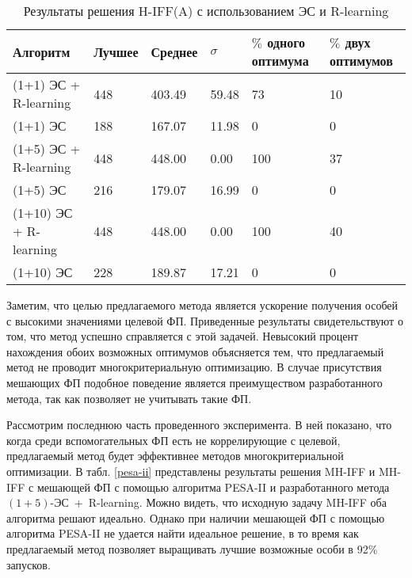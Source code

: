 \begin{table}[ht]
\begin{center}
\caption{Результаты решения H-IFF(A) с использованием ЭС и R-learning} \label{es-r}
\begin{tabular}{|l|l|l|l|l|l|}
\hline
Алгоритм & Лучшее & Среднее & $\sigma$ & $\%$ одного оптимума & $\%$ двух оптимумов\\
\hline
\rowcolor{light-gray}
(1+1) ЭС + R-learning & 448 & 403.49 & 59.48  & 73 & 10\\
(1+1) ЭС & 188 & 167.07 & 11.98 & 0 & 0\\ \hline
\rowcolor{light-gray}
(1+5) ЭС + R-learning & 448 & 448.00 & 0.00 & 100 & 37\\
(1+5) ЭС & 216 & 179.07 & 16.99 & 0 & 0 \\ \hline
\rowcolor{light-gray}
(1+10) ЭС + R-learning & 448 & 448.00 & 0.00 & 100 & 40\\
(1+10) ЭС & 228 & 189.87 & 17.21 & 0 & 0\\ \hline
\end{tabular}
\end{center}
\end{table}

Заметим, что целью предлагаемого метода является ускорение получения особей с высокими значениями целевой ФП. Приведенные результаты свидетельствуют о том, что метод успешно справляется с этой задачей. Невысокий процент нахождения обоих возможных оптимумов объясняется тем, что предлагаемый метод не проводит многокритериальную оптимизацию. В случае присутствия мешающих ФП подобное поведение является преимуществом разработанного метода, так как позволяет не учитывать такие ФП.

Рассмотрим последнюю часть проведенного эксперимента. В ней показано, что когда среди вспомогательных ФП есть не коррелирующие с целевой, предлагаемый метод будет эффективнее методов многокритериальной оптимизации. В табл. \ref{pesa-ii} представлены результаты решения MH-IFF и MH-IFF с мешающей ФП с помощью алгоритма PESA-II \cite{pesa-ii} и разработанного метода $(1 + 5)$-ЭС~+~R-learning. Можно видеть, что исходную задачу MH-IFF оба алгоритма решают идеально. Однако при наличии мешающей ФП с помощью алгоритма PESA-II не удается найти идеальное решение, в то время как предлагаемый метод позволяет выращивать лучшие возможные особи в 92\% запусков.

